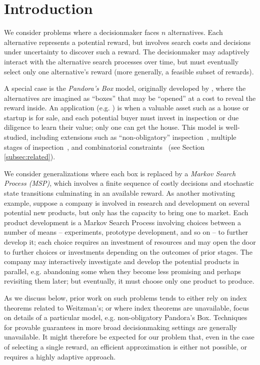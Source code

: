 \section{Introduction} \label{sec:intro}



We consider problems where a decisionmaker faces $n$ alternatives.
Each alternative represents a potential reward, but involves search costs and decisions under uncertainty to discover such a reward.
The decisionmaker may adaptively interact with the alternative search processes over time, but must eventually select only one alternative's reward (more generally, a feasible subset of rewards).

A special case is the \emph{Pandora's Box} model, originally developed by \citet{weitzman1979optimal}, where the alternatives are imagined as ``boxes'' that may be ``opened'' at a cost to reveal the reward inside.
An application (e.g. \citet{kleinberg2016descending}) is when a valuable asset such as a house or startup is for sale, and each potential buyer must invest in inspection or due diligence to learn their value; only one can get the house.
This model is well-studied, including extensions such as ``non-obligatory'' inspection~\citep[e.g.]{doval2018whether,beyhaghi2019pandora}, multiple stages of inspection~\citep[e.g.]{kleinberg2016descending,bowers2024matching}, and combinatorial constraints~\citep{singla2018price,gupta2019markovian} (see Section \ref{subsec:related}).

We consider generalizations where each box is replaced by a \emph{Markov Search Process (MSP)}, which involves a finite sequence of costly decisions and stochastic state transitions culminating in an available reward.
As another motivating example, suppose a company is involved in research and development on several potential new products, but only has the capacity to bring one to market.
Each product development is a Markov Search Process involving choices between a number of means -- experiments, prototype development, and so on -- to further develop it; each choice requires an investment of resources and may open the door to further choices or investments depending on the outcomes of prior stages.
The company may interactively investigate and develop the potential products in parallel, e.g. abandoning some when they become less promising and perhaps revisiting them later; but eventually, it must choose only one product to produce.

As we discuss below, prior work on such problems tends to either rely on index theorems related to Weitzman's; or where index theorems are unavailable, focus on details of a particular model, e.g. non-obligatory Pandora's Box.
Techniques for provable guarantees in more broad decisionmaking settings are generally unavailable.
It might therefore be expected for our problem that, even in the case of selecting a single reward, an efficient approximation is either not possible, or requires a highly adaptive approach.

